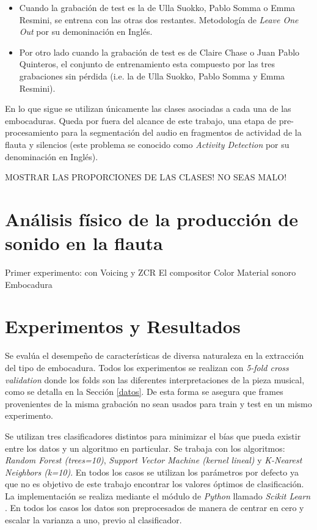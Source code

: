 \documentclass{article}
\begin{document}
\begin{itemize} 
  \item Cuando la grabación de test es la de Ulla Suokko, Pablo Somma o Emma Resmini, se entrena con las otras dos restantes. Metodología de \textit{Leave One Out} por su demoninación en Inglés.
  \item Por otro lado cuando la grabación de test es de Claire Chase o Juan Pablo Quinteros, el conjunto de entrenamiento esta compuesto por las tres grabaciones sin pérdida (i.e. la de Ulla Suokko, Pablo Somma y Emma Resmini).
\end{itemize}

En lo que sigue se utilizan únicamente las clases asociadas a cada una de las embocaduras. Queda por fuera del alcance de este trabajo, una etapa de pre-procesamiento para la segmentación del audio en fragmentos de actividad de la flauta y silencios (este problema se conocido como \textit{Activity Detection} por su denominación en Inglés). 
\medskip 

MOSTRAR LAS PROPORCIONES DE LAS CLASES! NO SEAS MALO!

\section{Análisis físico de la producción de sonido en la flauta}

Primer experimento: con Voicing y ZCR \citep[Capítulo~4]{rabiner1978digital}
El compositor 
Color
Material sonoro
Embocadura
   
\section{Experimentos y Resultados}

Se evalúa el desempeño de características de diversa naturaleza en la extracción del tipo de embocadura. Todos los experimentos se realizan con \textit{5-fold cross validation} donde los folds son las diferentes interpretaciones de la pieza musical, como se detalla en la Sección \ref{datos}. De esta forma se asegura que frames provenientes de la misma grabación no sean usados para train y test en un mismo experimento.
\medskip

Se utilizan tres clasificadores distintos para minimizar el bías que pueda existir entre los datos y un algoritmo en particular. Se trabaja con los algoritmos: \textit{Random Forest (trees=10)}, \textit{Support Vector Machine (kernel lineal)} y \textit{K-Nearest Neighbors (k=10)}. En todos los casos se utilizan los parámetros por defecto ya que no es objetivo de este trabajo encontrar los valores óptimos de clasificación. La implementación se realiza mediante el módulo de \textit{Python} llamado \textit{Scikit Learn} \citep{pedregosa2011scikit}. En todos los casos los datos son preprocesados de manera de centrar en cero y escalar la varianza a uno, previo al clasificador.
\medskip
\end{document}
